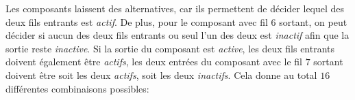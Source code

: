 {{Les composants \raisebox{\dimexpr -0.5ex -0.6ex \relax}{} laissent des alternatives, car ils permettent de décider lequel des deux fils entrants est \emph{actif}. De plus, pour le composant \raisebox{\dimexpr -0.5ex -0.6ex \relax}{} avec fil $6$ sortant, on peut décider si aucun des deux fils entrants ou seul l’un des deux est \emph{inactif} afin que la sortie reste \emph{inactive}. Si la sortie du composant \raisebox{\dimexpr -0.5ex -0.6ex \relax}{} est \emph{active}, les deux fils entrants doivent également être \emph{actifs}, les deux entrées du composant \raisebox{\dimexpr -0.5ex -0.6ex \relax}{} avec le fil $7$ sortant doivent être soit les deux \emph{actifs}, soit les deux \emph{inactifs}. Cela donne au total $16$ différentes combinaisons possibles:

}}
